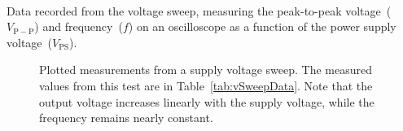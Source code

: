 \begin{table}[H]
	\centering
	\\
	\parbox{.6\textwidth}{
	\caption[Voltage Sweep Data]{Data recorded from the voltage sweep,
		measuring the peak-to-peak voltage~($V_\mathrm{P-P}$) and
		frequency~($f$) on an oscilloscope as a function of the power supply
		voltage~($V_\mathrm{PS}$).}
	\label{tab:vSweepData}}
\end{table}

\begin{figure}[H]
	\centering
	
	\parbox{4.25in}{
	\caption[Voltage Sweep Plot]{Plotted measurements from a supply voltage
	sweep.  The measured values from this test are in
	Table~\ref{tab:vSweepData}.  Note that the output voltage increases
	linearly with the supply voltage, while the frequency remains nearly
	constant.}
	\label{fig:vSweepPlots}}
\end{figure}
